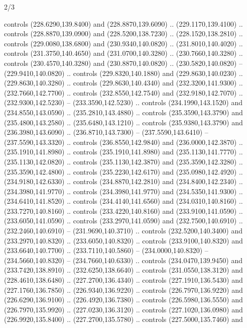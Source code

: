 \begin{flagdescription}{2/3}
\begin{scope}[xshift=0.5\flaglength,yshift=0.5\flagwidth,scale=\flagwidth/259.2]
\begin{scope}[y=0.8pt, x=0.8pt, yscale=-1,shift={(-243,-162)}]
      controls (228.6290,139.8400) and (228.8870,139.6090) .. (229.1170,139.4100) ..
      controls (228.8870,139.0900) and (228.5200,138.7230) .. (228.1520,138.2810) ..
      controls (229.0080,138.6800) and (230.9340,140.0820) .. (231.8010,140.4020) ..
      controls (231.3750,140.4650) and (231.0700,140.3280) .. (230.7660,140.3280) ..
      controls (230.4570,140.3280) and (230.8870,140.0820) .. (230.5820,140.0820) --
      (229.9410,140.0820) .. controls (229.8320,140.1880) and (229.8630,140.0230) ..
      (229.8630,140.3280) .. controls (229.8630,140.4340) and (232.3200,141.9300) ..
      (232.7660,142.7700) .. controls (232.8550,142.7540) and (232.9180,142.7070) ..
      (232.9300,142.5230) -- (233.3590,142.5230) .. controls (234.1990,143.1520) and
      (234.8550,143.0590) .. (235.2810,143.4880) .. controls (235.3590,143.3790) and
      (235.4800,143.2580) .. (235.6480,143.1210) .. controls (235.9380,143.3790) and
      (236.3980,143.6090) .. (236.8710,143.7300) -- (237.5590,143.6410) --
      (237.5590,143.3320) .. controls (236.8550,142.9840) and (236.0000,142.3870) ..
      (235.1910,141.8980) .. controls (235.1910,141.8980) and (235.1130,141.7770) ..
      (235.1130,142.0820) .. controls (235.1130,142.3870) and (235.3590,142.3280) ..
      (235.3590,142.4800) .. controls (235.2230,142.6170) and (235.0980,142.4920) ..
      (234.9180,142.6330) .. controls (234.8870,142.2810) and (234.8400,142.2340) ..
      (234.3980,141.9770) .. controls (234.3980,141.9770) and (234.5350,141.9300) ..
      (234.6410,141.8520) .. controls (234.4140,141.6560) and (234.0310,140.8160) ..
      (233.7270,140.8160) .. controls (233.4220,140.8160) and (233.9100,141.0590) ..
      (233.6050,141.0590) .. controls (233.2970,141.0590) and (232.7500,140.6910) ..
      (232.2460,140.6910) -- (231.9690,140.3710) .. controls (232.5200,140.3400) and
      (233.2970,140.8320) .. (233.6050,140.8320) .. controls (233.9100,140.8320) and
      (233.6640,140.7700) .. (233.7110,140.5860) -- (234.0000,140.8320) --
      (234.5660,140.8320) -- (234.7660,140.6330) .. controls (234.0470,139.9450) and
      (233.7420,138.8910) .. (232.6250,138.6640) .. controls (231.0550,138.3120) and
      (228.4610,138.6480) .. (227.2700,136.4340) .. controls (227.1910,136.5430) and
      (227.1760,136.7850) .. (226.9340,136.9220) .. controls (226.7970,136.9220) and
      (226.6290,136.9100) .. (226.4920,136.7380) .. controls (226.5980,136.5550) and
      (226.7970,135.9920) .. (227.0230,136.3120) .. controls (227.1020,136.0980) and
      (226.9920,135.8400) .. (227.2700,135.5780) .. controls (227.5000,135.7460) and

\end{scope}
\end{scope}
\end{flagdescription}
